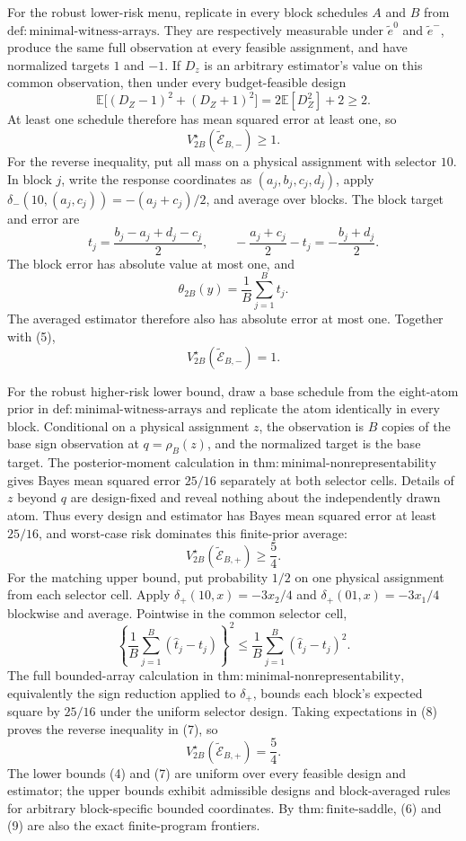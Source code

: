 For the robust lower-risk menu, replicate in every block schedules \(A\) and \(B\) from \(\mathrm{def{:}minimal\text{-}witness\text{-}arrays}\).  They are respectively measurable under \(\widetilde e^0\) and \(\widetilde e^-\), produce the same full observation at every feasible assignment, and have normalized targets \(1\) and \(-1\).  If \(D_z\) is an arbitrary estimator's value on this common observation, then under every budget-feasible design
\[
 \mathbb E\bigl[(D_Z-1)^2+(D_Z+1)^2\bigr]
 =2\mathbb E[D_Z^2]+2\ge2. \tag{4}
\]
At least one schedule therefore has mean squared error at least one, so
\[
 V_{2B}^\star(\widetilde{\mathcal E}_{B,-})\ge1. \tag{5}
\]
For the reverse inequality, put all mass on a physical assignment with selector \(10\).  In block \(j\), write the response coordinates as \((a_j,b_j,c_j,d_j)\), apply \(\delta_-(10,(a_j,c_j))=-(a_j+c_j)/2\), and average over blocks.  The block target and error are
\[
 t_j=\frac{b_j-a_j+d_j-c_j}{2},
 \qquad
 -\frac{a_j+c_j}{2}-t_j=-\frac{b_j+d_j}{2}.
\]
The block error has absolute value at most one, and
\[
 \theta_{2B}(y)=\frac1B\sum_{j=1}^Bt_j.
\]
The averaged estimator therefore also has absolute error at most one.  Together with (5),
\[
 V_{2B}^\star(\widetilde{\mathcal E}_{B,-})=1. \tag{6}
\]

For the robust higher-risk lower bound, draw a base schedule from the eight-atom prior in \(\mathrm{def{:}minimal\text{-}witness\text{-}arrays}\) and replicate the atom identically in every block.  Conditional on a physical assignment \(z\), the observation is \(B\) copies of the base sign observation at \(q=\rho_B(z)\), and the normalized target is the base target.  The posterior-moment calculation in \(\mathrm{thm{:}minimal\text{-}nonrepresentability}\) gives Bayes mean squared error \(25/16\) separately at both selector cells.  Details of \(z\) beyond \(q\) are design-fixed and reveal nothing about the independently drawn atom.  Thus every design and estimator has Bayes mean squared error at least \(25/16\), and worst-case risk dominates this finite-prior average:
\[
 V_{2B}^\star(\widetilde{\mathcal E}_{B,+})\ge\frac54. \tag{7}
\]
For the matching upper bound, put probability \(1/2\) on one physical assignment from each selector cell.  Apply \(\delta_+(10,x)=-3x_2/4\) and \(\delta_+(01,x)=-3x_1/4\) blockwise and average.  Pointwise in the common selector cell,
\[
 \left\{\frac1B\sum_{j=1}^B(\widehat t_j-t_j)\right\}^2
 \le\frac1B\sum_{j=1}^B(\widehat t_j-t_j)^2. \tag{8}
\]
The full bounded-array calculation in \(\mathrm{thm{:}minimal\text{-}nonrepresentability}\), equivalently the sign reduction applied to \(\delta_+\), bounds each block's expected square by \(25/16\) under the uniform selector design.  Taking expectations in (8) proves the reverse inequality in (7), so
\[
 V_{2B}^\star(\widetilde{\mathcal E}_{B,+})=\frac54. \tag{9}
\]
The lower bounds (4) and (7) are uniform over every feasible design and estimator; the upper bounds exhibit admissible designs and block-averaged rules for arbitrary block-specific bounded coordinates.  By \(\mathrm{thm{:}finite\text{-}saddle}\), (6) and (9) are also the exact finite-program frontiers.

